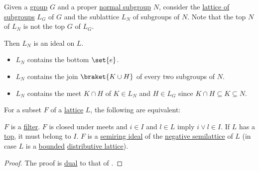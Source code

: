 \begin{example}
\begin{thmenum}
     Given a \hyperref[def:group]{group} \( G \) and a proper \hyperref[thm:normal_subgroup_equivalences]{normal subgroup} \( N \), consider the \hyperref[thm:substructures_form_complete_lattice]{lattice of subgroups} \( L_G \) of \( G \) and the sublattice \( L_N \) of subgroups of \( N \). Note that the top \( N \) of \( L_N \) is not the top \( G \) of \( L_G \).

    Then \( L_N \) is an ideal on \( L \).
    \begin{itemize}
      \item \( L_N \) contains the bottom \( \set{ e } \).
      \item \( L_N \) contains the join \( \braket{ K \cup H } \) of every two subgroups of \( N \).
      \item \( L_N \) contains the meet \( K \cap H \) of \( K \in L_N \) and \( H \in L_G \) since \( K \cap H \subseteq K \subseteq N \).
    \end{itemize}
  \end{thmenum}
\end{example}

\begin{proposition}\label{thm:lattice_filters}
  For a subset \( F \) of a \hyperref[def:semilattice/lattice]{lattice} \( L \), the following are equivalent:
  \begin{thmenum}
     \( F \) is a \hyperref[def:order_ideal_and_filter]{filter}.
     \( F \) is closed under meets and \( i \in I \) and \( l \in L \) imply \( i \vee l \in I \). If \( L \) has a \hyperref[def:partially_ordered_set_extremal_points/top_and_bottom]{top}, it must belong to \( I \).
     \( F \) is a \hyperref[def:semiring_ideal]{semiring ideal} of the \hyperref[ex:def:semiring/lattice]{negative semilattice} of \( L \) (in case \( L \) is a \hyperref[def:semilattice/bounded]{bounded} \hyperref[def:semilattice/distributive_lattice]{distributive lattice}).
  \end{thmenum}
\end{proposition}
\begin{proof}
  The proof is \hyperref[def:semilattice/duality]{dual} to that of .
\end{proof}

